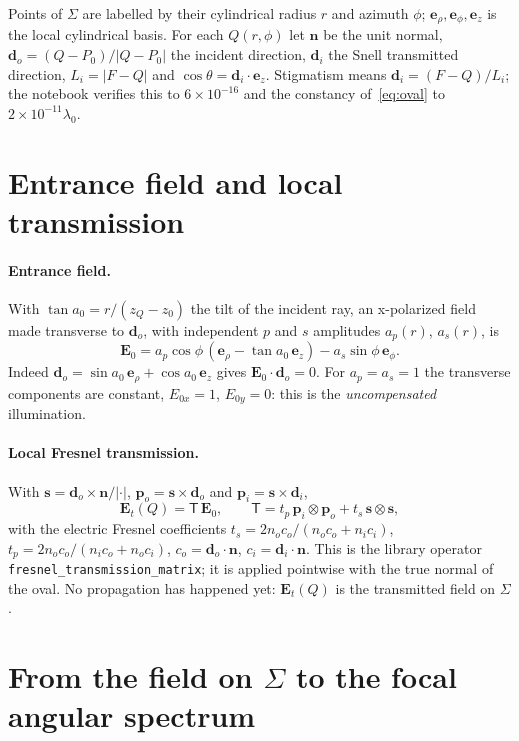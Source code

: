 \documentclass[11pt,a4paper]{article}
\newcommand{\ve}[1]{\bm{#1}}
\newcommand{\er}{\ve e_\rho}
\newcommand{\ep}{\ve e_\phi}
\newcommand{\ez}{\ve e_z}
\begin{document}
Points of $\Sigma$ are labelled by their cylindrical radius $r$ and azimuth
$\phi$; $\er,\ep,\ez$ is the local cylindrical basis. For each $Q(r,\phi)$ let
$\ve n$ be the unit normal, $\ve d_o=(Q-P_0)/|Q-P_0|$ the incident direction,
$\ve d_i$ the Snell transmitted direction, $L_i=|F-Q|$ and
$\cos\theta=\ve d_i\cdot\ez$. Stigmatism means $\ve d_i=(F-Q)/L_i$; the notebook
verifies this to $6\times10^{-16}$ and the constancy of~\eqref{eq:oval} to
$2\times10^{-11}\lambda_0$.

\section{Entrance field and local transmission}

\paragraph{Entrance field.} With $\tan a_0=r/(z_Q-z_0)$ the tilt of the incident
ray, an x-polarized field made transverse to $\ve d_o$, with independent $p$ and
$s$ amplitudes $a_p(r)$, $a_s(r)$, is
\begin{equation}
 \ve E_0 = a_p\cos\phi\,(\er-\tan a_0\,\ez) - a_s\sin\phi\,\ep .
 \label{eq:entrance}
\end{equation}
Indeed $\ve d_o=\sin a_0\,\er+\cos a_0\,\ez$ gives $\ve E_0\cdot\ve d_o=0$. For
$a_p=a_s=1$ the transverse components are constant, $E_{0x}=1$, $E_{0y}=0$: this
is the \emph{uncompensated} illumination.

\paragraph{Local Fresnel transmission.} With $\ve s=\ve d_o\times\ve n/|\cdot|$,
$\ve p_o=\ve s\times\ve d_o$ and $\ve p_i=\ve s\times\ve d_i$,
\begin{equation}
 \ve E_t(Q) = \mathsf T\,\ve E_0,\qquad
 \mathsf T = t_p\,\ve p_i\otimes\ve p_o + t_s\,\ve s\otimes\ve s ,
 \label{eq:T}
\end{equation}
with the electric Fresnel coefficients
$t_s=2n_o c_o/(n_o c_o+n_i c_i)$, $t_p=2n_o c_o/(n_i c_o+n_o c_i)$,
$c_o=\ve d_o\cdot\ve n$, $c_i=\ve d_i\cdot\ve n$. This is the library operator
\texttt{fresnel\_transmission\_matrix}; it is applied pointwise with the true
normal of the oval. No propagation has happened yet: $\ve E_t(Q)$ is the
transmitted field on $\Sigma$.

\section{From the field on $\Sigma$ to the focal angular spectrum}
\end{document}
